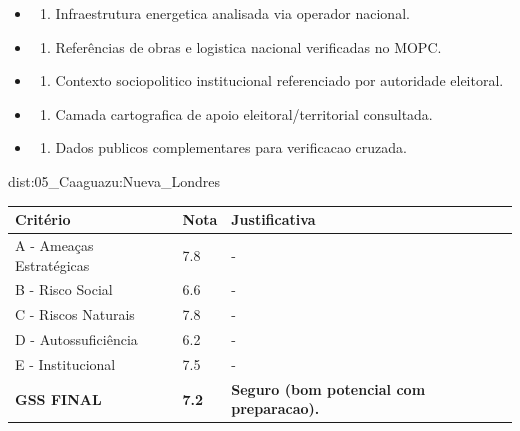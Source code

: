 {\begin{itemize}
\item
  \begin{enumerate}
  \def\labelenumi{\arabic{enumi})}
  \setcounter{enumi}{7}
  \tightlist
  \item
    Infraestrutura energetica analisada via operador nacional.
  \end{enumerate}
\item
  \begin{enumerate}
  \def\labelenumi{\arabic{enumi})}
  \setcounter{enumi}{8}
  \tightlist
  \item
    Referências de obras e logistica nacional verificadas no MOPC.
  \end{enumerate}
\item
  \begin{enumerate}
  \def\labelenumi{\arabic{enumi})}
  \setcounter{enumi}{9}
  \tightlist
  \item
    Contexto sociopolitico institucional referenciado por autoridade
    eleitoral.
  \end{enumerate}
\item
  \begin{enumerate}
  \def\labelenumi{\arabic{enumi})}
  \setcounter{enumi}{10}
  \tightlist
  \item
    Camada cartografica de apoio eleitoral/\allowbreak territorial consultada.
  \end{enumerate}
\item
  \begin{enumerate}
  \def\labelenumi{\arabic{enumi})}
  \setcounter{enumi}{11}
  \tightlist
  \item
    Dados publicos complementares para verificacao cruzada.
  \end{enumerate}
\end{itemize}}{dist:05_Caaguazu:Nueva_Londres}
\begin{table}[ht!]
\small \begin{tabular}{p{3.0cm}p{0.8cm}p{6.0cm}} \toprule
\textbf{Critério} & \textbf{Nota} & \textbf{Justificativa} \\ \midrule
A - Ameaças Estratégicas & 7.8 & - \\
B - Risco Social & 6.6 & - \\
C - Riscos Naturais & 7.8 & - \\
D - Autossuficiência & 6.2 & - \\
E - Institucional & 7.5 & - \\
\midrule \textbf{GSS FINAL} & \textbf{7.2} & \textbf{Seguro (bom potencial com preparacao).} \\ \bottomrule \end{tabular}
\end{table}

